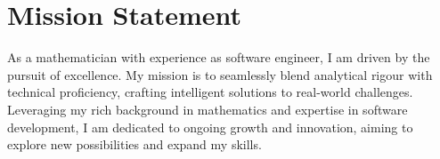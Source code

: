 \documentclass[a4paper, 11pt]{article}
\begin{document}

\section{Mission Statement}
As a mathematician with experience as software engineer, I am driven by the pursuit of excellence. My mission is to seamlessly blend analytical rigour with technical proficiency, crafting intelligent solutions to real-world challenges. Leveraging my rich background in mathematics and expertise in software development, I am dedicated to ongoing growth and innovation, aiming to explore new possibilities and expand my skills.

\end{document}
